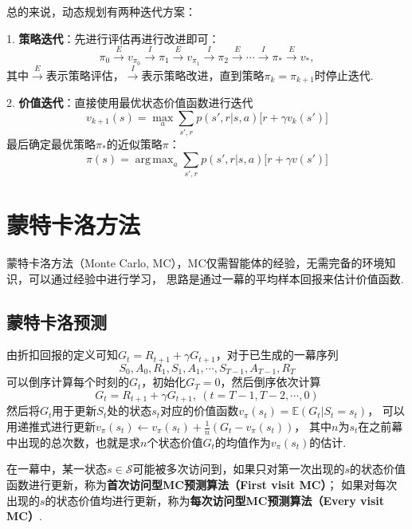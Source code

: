 \documentclass[12pt, a4paper, oneside]{ctexart}
\numberwithin{equation}{section}  %
\DeclareMathOperator*{\argmax}{arg\,max}  %
\def\S{\mathcal{S}}         %
\def\E{\mathbb{E}}          %
\def\add{\vspace{1ex}}      %
\begin{document}
总的来说，动态规划有两种迭代方案：

1. \textbf{策略迭代}：先进行评估再进行改进即可：
\begin{equation*}
    \pi_0\xrightarrow{E}v_{\pi_0}\xrightarrow{I}\pi_1\xrightarrow{E}v_{\pi_1}\xrightarrow{I}\pi_2\xrightarrow{E}\cdots\xrightarrow{I}\pi_*\xrightarrow{E}v_*,
\end{equation*}
其中$\xrightarrow{E}$表示策略评估，$\xrightarrow{I}$表示策略改进，直到策略$\pi_k = \pi_{k+1}$时停止迭代.

2. \textbf{价值迭代}：直接使用最优状态价值函数进行迭代
\begin{equation*}
    v_{k+1}(s) = \max_a\sum_{s',r}p(s',r|s,a)\big[r+\gamma v_k(s')\big]
\end{equation*}
最后确定最优策略$\pi_*$的近似策略$\pi$：
\begin{equation*}
    \pi(s) = \argmax_{a}\sum_{s',r}p(s',r|s,a)\big[r+\gamma v(s')\big]
\end{equation*}
\section{蒙特卡洛方法}
蒙特卡洛方法（Monte Carlo, MC），MC仅需智能体的经验，无需完备的环境知识，可以通过经验中进行学习，
思路是通过一幕的平均样本回报来估计价值函数.

\subsection{蒙特卡洛预测}
由折扣回报的定义可知$G_{t} = R_{t+1} + \gamma G_{t+1}$，对于已生成的一幕序列
\begin{equation*}
    S_0,A_0,R_1,S_1,A_1,\cdots, S_{T-1}, A_{T-1},R_T
\end{equation*}
可以倒序计算每个时刻的$G_{t}$，初始化$G_{T} = 0$，然后倒序依次计算
\begin{equation*}
    G_{t} = R_{t+1}+\gamma G_{t+1},\ (t=T-1,T-2,\cdots,0)   
\end{equation*}
然后将$G_t$用于更新$S_t$处的状态$s_t$对应的价值函数$v_{\pi}(s_t) = \E(G_t|S_t = s_t)$，\add
可以用递推式进行更新$v_{\pi}(s_t) \leftarrow v_{\pi}(s_t) + \frac{1}{n}(G_t - v_{\pi}(s_t))$\add ，
其中$n$为$s_t$在之前幕中出现的总次数，也就是求$n$个状态价值$G_t$的均值作为$v_{\pi}(s_t)$的估计.

在一幕中，某一状态$s\in\S$可能被多次访问到，如果只对第一次出现的$s$的状态价值函数进行更新，称为\textbf{首次访问型MC预测算法（First visit MC）}；
如果对每次出现的$s$的状态价值均进行更新，称为\textbf{每次访问型MC预测算法（Every visit MC）}.
\end{document}
